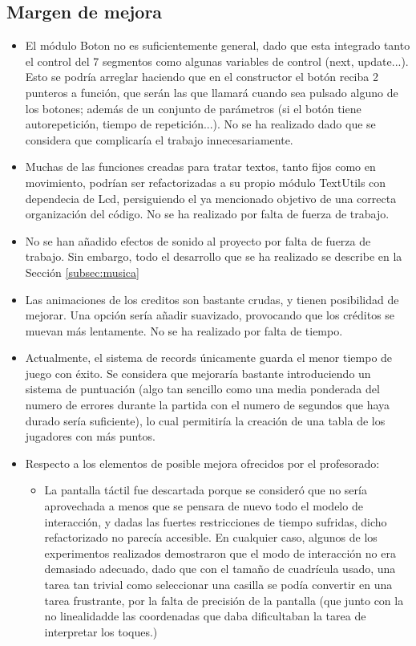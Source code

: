 \documentclass[12pt,letterpaper]{article}
\begin{document}
\subsection{Margen de mejora}
\label{subsec:mejora}
\begin{itemize}
  \item El módulo Boton no es suficientemente general, dado que esta
    integrado tanto el control del 7 segmentos como algunas variables
    de control (next, update...). Esto se podría arreglar haciendo que
    en el constructor el botón reciba 2 punteros a función, que serán
    las que llamará cuando sea pulsado alguno de los botones; además
    de un conjunto de parámetros (si el botón tiene autorepetición,
    tiempo de repetición...). No se ha realizado dado que se considera
    que complicaría el trabajo innecesariamente.
  \item Muchas de las funciones creadas para tratar textos, tanto
    fijos como en movimiento, podrían ser refactorizadas a su propio
    módulo TextUtils con dependecia de Lcd, persiguiendo el ya
    mencionado objetivo de una correcta organización del código. No se
    ha realizado por falta de fuerza de trabajo.
  \item No se han añadido efectos de sonido al proyecto por falta de
    fuerza de trabajo. Sin embargo, todo el desarrollo que se ha
    realizado se describe en la Sección \ref{subsec:musica}
  \item Las animaciones de los creditos son bastante crudas, y tienen
    posibilidad de mejorar. Una opción sería añadir suavizado,
    provocando que los créditos se muevan más lentamente. No se ha
    realizado por falta de tiempo.
  \item Actualmente, el sistema de records únicamente guarda el menor
    tiempo de juego con éxito. Se considera que mejoraría bastante
    introduciendo un sistema de puntuación (algo tan sencillo como una
    media ponderada del numero de errores durante la partida con el
    numero de segundos que haya durado sería suficiente), lo cual
    permitiría la creación de una tabla de los jugadores con más
    puntos.
  \item Respecto a los elementos de posible mejora ofrecidos por el
    profesorado:
    \begin{itemize}
    \item La pantalla táctil fue descartada porque se consideró que no
      sería aprovechada a menos que se pensara de nuevo todo el modelo
      de interacción, y dadas las fuertes restricciones de tiempo
      sufridas, dicho refactorizado no parecía accesible. En cualquier
      caso, algunos de los experimentos realizados demostraron que el
      modo de interacción no era demasiado adecuado, dado que con el
      tamaño de cuadrícula usado, una tarea tan trivial como
      seleccionar una casilla se podía convertir en una tarea
      frustrante, por la falta de precisión de la pantalla (que junto
      con la no linealidad\footnotemark[1] de las coordenadas que daba
      dificultaban la tarea de interpretar los toques.)


\end{itemize}
\end{itemize}
\end{document}
